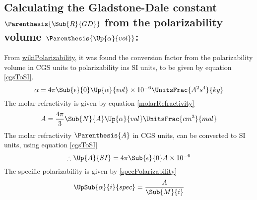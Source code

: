        \subsection{Calculating the Gladstone-Dale constant $\Parenthesis{\Sub{R}{GD}}$ from the polarizability volume $\Parenthesis{\Up{\alpha}{vol}}$:}
            \indent From \href{https://en.wikipedia.org/wiki/Polarizability}{wikiPolarizability}, it was found the conversion factor from the polarizability volume in CGS units to polarizability ins SI units, to be given by equation \eqref{cgsToSI}. 
            \begin{equation}\label{cgsToSI}
                \alpha = 4\pi\Sub{\epsilon}{0}\Up{\alpha}{vol}\times10^{-6}\UnitsFrac{A^2s^4}{kg} 
            \end{equation}
            \indent The molar refractivity is given by equation \eqref{molarRefractivity} 
            \begin{equation}\label{molarRefractivity}
                A = \frac{4\pi}{3}\Sub{N}{A}\Up{\alpha}{vol}\UnitsFrac{cm^3}{mol} 
            \end{equation}
            \indent The molar refractivity $\Parenthesis{A}$ in CGS units, can be converted to SI units, using equation \eqref{cgsToSI}
            $$ \therefore \Up{A}{SI} = 4\pi\Sub{\epsilon}{0}A\times 10^{-6} $$
            \indent The specific polarizability is given by \eqref{specPolarizability}
            \begin{equation}\label{specPolarizability}
                    \UpSub{\alpha}{i}{spec} = \frac{A}{\Sub{M}{i}}  
            \end{equation}


